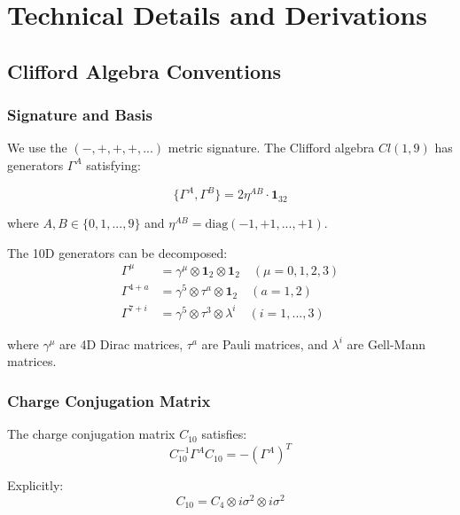 \appendix
\section{Technical Details and Derivations}
\label{app:technical_details}

\subsection{Clifford Algebra Conventions}

\subsubsection{Signature and Basis}

We use the $(-, +, +, +, ...)$ metric signature. The Clifford algebra $Cl(1,9)$ has generators $\Gamma^A$ satisfying:

\begin{equation}
    \{\Gamma^A, \Gamma^B\} = 2\eta^{AB} \cdot \mathbf{1}_{32}
\end{equation}

where $A, B \in \{0, 1, ..., 9\}$ and $\eta^{AB} = \text{diag}(-1, +1, ..., +1)$.

The 10D generators can be decomposed:
\begin{align}
    \Gamma^\mu &= \gamma^\mu \otimes \mathbf{1}_2 \otimes \mathbf{1}_2 \quad (\mu = 0,1,2,3) \\
    \Gamma^{4+a} &= \gamma^5 \otimes \tau^a \otimes \mathbf{1}_2 \quad (a = 1,2) \\
    \Gamma^{7+i} &= \gamma^5 \otimes \tau^3 \otimes \lambda^i \quad (i = 1,...,3)
\end{align}

where $\gamma^\mu$ are 4D Dirac matrices, $\tau^a$ are Pauli matrices, and $\lambda^i$ are Gell-Mann matrices.

\subsubsection{Charge Conjugation Matrix}

The charge conjugation matrix $C_{10}$ satisfies:
\begin{equation}
    C_{10}^{-1} \Gamma^A C_{10} = -(\Gamma^A)^T
\end{equation}

Explicitly:
\begin{equation}
    C_{10} = C_4 \otimes i\sigma^2 \otimes i\sigma^2
\end{equation}

